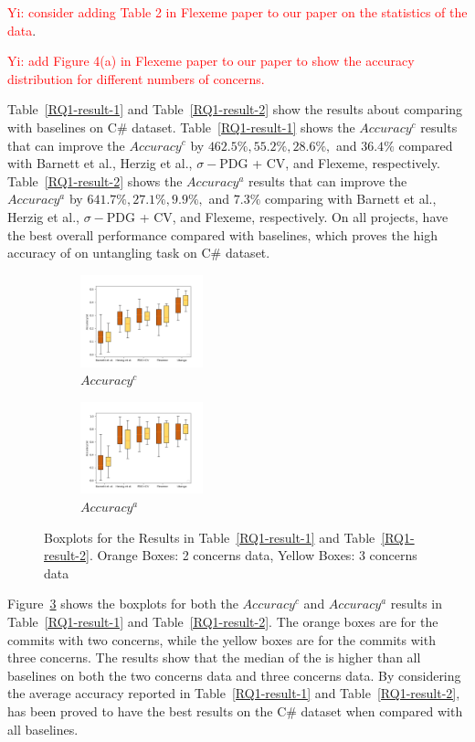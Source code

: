 \textcolor{red}{Yi: consider adding Table 2 in Flexeme paper to our paper on the statistics of the data}.

\textcolor{red}{Yi: add Figure 4(a) in Flexeme paper to our paper to show
  the accuracy distribution for different numbers of concerns.}

Table~\ref{RQ1-result-1} and Table~\ref{RQ1-result-2} show the results about comparing \tool with baselines on C\# dataset. Table~\ref{RQ1-result-1} shows the $Accuracy^c$ results that \tool can improve the $Accuracy^c$ by $462.5\%, 55.2\%, 28.6\%, $ and $36.4\%$ compared with Barnett et al., Herzig et al., $\sigma-$PDG + CV, and Flexeme, respectively. Table~\ref{RQ1-result-2} shows the $Accuracy^a$ results that \tool can improve the  $Accuracy^a$ by $641.7\%, 27.1\%, 9.9\%, $ and $7.3\%$ comparing with Barnett et al., Herzig et al., $\sigma-$PDG + CV, and Flexeme, respectively. On all projects, \tool have the best overall performance compared with baselines, which proves the high accuracy of \tool on untangling task on C\# dataset.


\begin{figure}
	\centering
	\begin{subfigure}{0.2\textwidth}
		\centering
		\includegraphics[width=1.4in]{figures/RQ_1_1.png}
		\caption{$Accuracy^c$}
		\label{RQ1-result-3-1}
	\end{subfigure}
	\begin{subfigure}{0.2\textwidth}
		\centering
		\includegraphics[width=1.4in]{figures/RQ_1_2.png}
		\caption{$Accuracy^a$}
		\label{RQ1-result-3-2}
	\end{subfigure}
	\caption{Boxplots for the Results in Table~\ref{RQ1-result-1} and Table~\ref{RQ1-result-2}. Orange Boxes: 2 concerns data, Yellow Boxes: 3 concerns data}
	\label{RQ1-result-3}
\end{figure}

Figure~\ref{RQ1-result-3} shows the boxplots for both the $Accuracy^c$ and $Accuracy^a$ results in Table~\ref{RQ1-result-1} and Table~\ref{RQ1-result-2}. The orange boxes are for the commits with two concerns, while the yellow boxes are for the commits with three concerns. The results show that the median of the \tool is higher than all baselines on both the two concerns data and three concerns data. By considering the average accuracy reported in Table~\ref{RQ1-result-1} and Table~\ref{RQ1-result-2}, \tool has been proved to have the best results on the C\# dataset when compared with all baselines.

